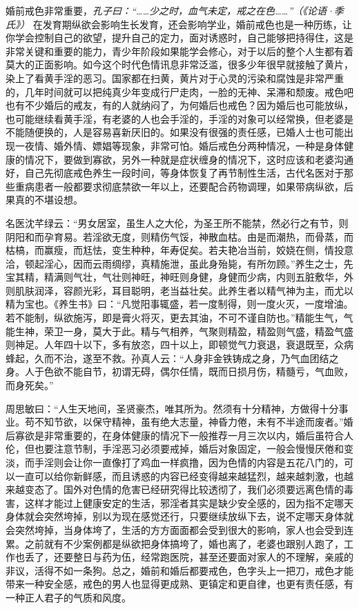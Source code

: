 婚前戒色非常重要，\textit{孔子曰：“……少之时，血气未定，戒之在色……”（《论语·季氏》）} 在发育期纵欲会影响生长发育，还会影响学业，婚前戒色也是一种历练，让你学会控制自己的欲望，提升自己的定力，面对诱惑时，自己能够把持得住，这是非常关键和重要的能力，青少年阶段如果能学会修心，对于以后的整个人生都有着莫大的正面影响。如今这个时代色情讯息非常泛滥，很多少年很早就接触了黄片，染上了看黄手淫的恶习。国家都在扫黄，黄片对于心灵的污染和腐蚀是非常严重的，几年时间就可以把纯真少年变成行尸走肉，一脸的无神、呆滞和颓废。戒色吧也有不少婚后的戒友，有的人就纳闷了，为何婚后也戒色？因为婚后也可能放纵，也可能继续看黄手淫，有老婆的人也会手淫的，手淫的对象可以经常换，但老婆是不能随便换的，人是容易喜新厌旧的。如果没有很强的责任感，已婚人士也可能出现一夜情、婚外情、嫖娼等现象，非常可怕。婚后戒色分两种情况，一种是身体健康的情况下，要做到寡欲，另外一种就是症状缠身的情况下，这时应该和老婆沟通好，自己先彻底戒色养生一段时间，等身体恢复了再节制性生活，古代名医对于那些重病患者一般都要求彻底禁欲一年以上，还要配合药物调理，如果带病纵欲，后果真的不堪设想。

名医沈芊绿云：“男女居室，虽生人之大伦，为圣王所不能禁，然必行之有节，则阴阳和而孕育易。若淫欲无度，则精伤气馁，神散血枯。由是而潮热，而骨蒸，而枯槁，而赢瘦，而尪怯，变生种种，年寿促矣。若夫艳冶当前，姣娆在侧，情投意洽，顿起淫心，因而云雨绸缪，真精施泄，虽此身殆毙，有所勿顾。”养生之士，先宝其精，精满则气壮，气壮则神旺，神旺则身健，身健而少病，内则五脏敷华，外则肌肤润泽，容颜光彩，耳目聪明，老当益壮矣。此养生者以精气神为主，而尤以精为宝也。《养生书》曰：“凡觉阳事辄盛，若一度制得，则一度火灭，一度增油。若不能制，纵欲施泻，即是膏火将灭，更去其油，不可不谨自防也。”精能生气，气能生神，荣卫一身，莫大于此。精与气相养，气聚则精盈，精盈则气盛，精盈气盛则神足。人年四十以下，多有放恣，四十以上，即顿觉气力衰退，衰退既至，众病蜂起，久而不治，遂至不救。孙真人云：“人身非金铁铸成之身，乃气血团结之身。人于色欲不能自节，初谓无碍，偶尔任情，既而日损月伤，精髓亏，气血败，而身死矣。”

周思敏曰：“人生天地间，圣贤豪杰，唯其所为。然须有十分精神，方做得十分事业。苟不知节欲，以保守精神，虽有绝大志量，神昏力倦，未有不半途而废者。”婚后寡欲是非常重要的，在身体健康的情况下一般推荐一月三次以内，婚后虽符合人伦，但也要注意节制，手淫恶习必须要戒掉，婚后对象固定，一般会慢慢厌倦和变淡，而手淫则会让你一直像打了鸡血一样疯撸，因为色情的内容是五花八门的，可以一直可以给你新鲜感，而且诱惑的内容已经变得越来越猛烈，越来越刺激，也越来越变态了。国外对色情的危害已经研究得比较透彻了，我们必须要远离色情的毒害，这样才能过上健康安定的生活，邪淫者其实是缺少安全感的，因为指不定哪天身体就会突然垮掉，别以为现在感觉还行，只要继续放纵下去，说不定哪天身体就会突然垮掉，当身体垮了，生活的方方面面都会受到很大的影响，家人也会受到连累。之前就有不少案例都是纵欲把身体搞垮了，婚也离了，老婆也跟别人跑了，工作也丢了，还要整日与药为伍，经常跑医院，甚至还要面对家人的不理解，亲戚的非议，活得不如一条狗。总之，婚前和婚后都要戒色，色字头上一把刀，戒色才能带来一种安全感，戒色的男人也显得更成熟、更镇定和更自律，也更有责任感，有一种正人君子的气质和风度。

